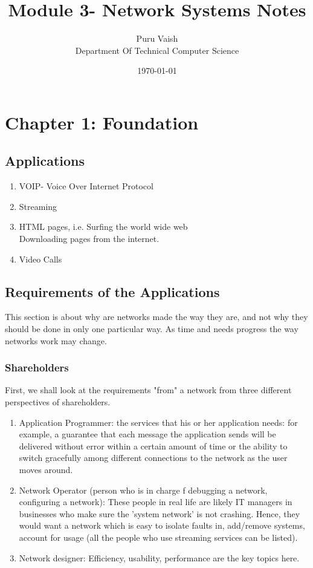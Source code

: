 \documentclass[12pt]{book}
\title{\vspace{-1.5cm}Module 3- Network Systems Notes}
\author{Puru Vaish\\Department Of Technical Computer Science}
\date{\today}
\begin{document}
\maketitle
\chapter{Chapter 1: Foundation}
\section{Applications}
\begin{enumerate}
    \item VOIP- Voice Over Internet Protocol
    \item Streaming
    \item HTML pages, i.e. Surfing the world wide web\\
    Downloading pages from the internet.
    \item Video Calls
\end{enumerate}
\section{Requirements of the Applications}
This section is about why are networks made the way they are, and not why they should be done in only one particular way. As time and needs progress the way networks work may change. 
\subsection{Shareholders}
First, we shall look at the requirements "from" a network from three different perspectives of shareholders.
\begin{enumerate}
    \item Application Programmer:
    the services that his or her application needs: for example, a guarantee that each message the application sends will be delivered without error within a certain amount of time or the ability to switch gracefully among different connections to the network as the user moves around.
    \item Network Operator (person who is in charge f debugging a network, configuring a network): These people in real life are likely IT managers in businesses who make sure the 'system network' is not crashing. Hence, they would want a network which is easy to isolate faults in, add/remove systems, account for usage (all the people who use streaming services can be listed).
    \item Network designer: Efficiency, usability, performance are the key topics here.
\end{enumerate}
\end{document}
